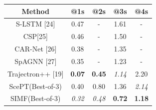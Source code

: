 \documentclass{article}
\begin{document}





 \begin{table}\vspace{-60pt}
                    \begin{tabular}{ccccc}
\toprule
Method  &@1s & @2s & @3s & @4s  \\
\midrule
S-LSTM [24]& 0.47 & - & 1.61 & - \\
CSP[25]      & 0.46 & - & 1.50 & - \\
CAR-Net [26] & 0.38 & - & 1.35 & - \\
SpAGNN [27] & 0.35 & -& 1.23 & - \\
Trajectron++ [19] & \textbf{0.07} & \textbf{0.45} & \textit{1.14 }& 2.20 \\
ScePT(Best-of-3) & 0.40 & 0.80 & 1.36 &\textit{ 2.14} \\
\midrule
SIMF(Best-of-3) & \textit{0.32 }& \textit{0.48} & \textbf{0.72}
 & \textbf{1.18 }\\
\bottomrule
\end{tabular}
\vspace{-0.35in}
\label{table:baseline}
\end{table}
\end{document}
